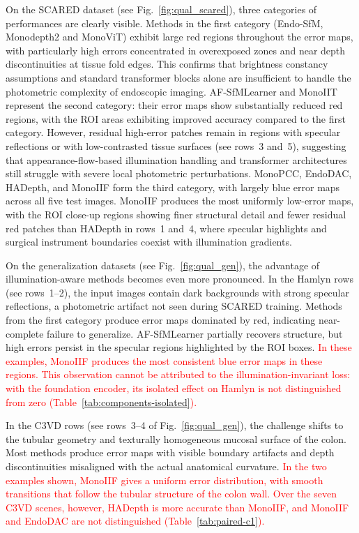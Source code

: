 \documentclass[a4paper,fleqn]{cas-dc}
\begin{document}
On the SCARED dataset (see Fig.~\ref{fig:qual_scared}), three categories of performances are clearly visible. 
Methods in the first category (Endo-SfM, Monodepth2 and MonoViT) exhibit large red regions throughout the error maps, with particularly high errors concentrated in overexposed zones and near depth discontinuities 
at tissue fold edges. This confirms that brightness constancy assumptions and standard transformer blocks alone are insufficient to handle the photometric complexity of endoscopic imaging. AF-SfMLearner and MonoIIT represent the second category: their error maps show substantially reduced red regions, with the ROI areas exhibiting improved accuracy compared to the first category. However, residual high-error patches remain in regions with specular reflections or with low-contrasted tissue surfaces (see rows~3 and~5), suggesting that appearance-flow-based illumination handling and transformer architectures still struggle with severe local photometric perturbations. MonoPCC, EndoDAC, HADepth, and MonoIIF form the third category, with largely blue error maps across all five test images. MonoIIF produces the most uniformly low-error maps, with the ROI close-up regions showing finer structural detail and fewer residual red patches than HADepth in rows~1 and~4, where specular highlights and surgical instrument boundaries coexist with illumination gradients.

On the generalization datasets (see Fig.~\ref{fig:qual_gen}), the advantage of illumination-aware methods becomes even more pronounced. In the Hamlyn rows (see rows~1--2), the input images contain dark backgrounds with strong specular reflections, a photometric artifact not seen during SCARED training. Methods from the first category produce error maps dominated by red, indicating near-complete failure to generalize. AF-SfMLearner partially recovers structure, but high errors persist in the specular regions highlighted by the ROI boxes. \textcolor{red}{In these examples, MonoIIF produces the most consistent blue error maps in these regions. This observation cannot be attributed to the illumination-invariant loss: with the foundation encoder, its isolated effect on Hamlyn is not distinguished from zero (Table~\ref{tab:components-isolated}).} 

In the C3VD rows (see rows~3--4 of  Fig.~\ref{fig:qual_gen}), the challenge shifts to the tubular geometry and texturally homogeneous mucosal surface of the colon. Most methods produce error maps with visible boundary artifacts and  depth discontinuities misaligned with the actual anatomical curvature. \textcolor{red}{In the two examples shown, MonoIIF gives a uniform error distribution, with smooth transitions that follow the tubular structure of the colon wall. Over the seven C3VD scenes, however, HADepth is more accurate than MonoIIF, and MonoIIF and EndoDAC are not distinguished (Table~\ref{tab:paired-c1}).}
\end{document}
